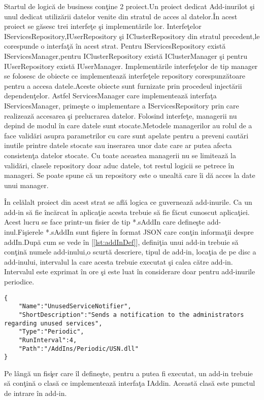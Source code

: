\documentclass[a4paper,12pt]{report}
\let\oldref\ref
\renewcommand{\ref}[1]{[\oldref{#1}]}
\begin{document}
Startul  de logic\u a de business con\c tine 2 proiect.Un proiect dedicat Add-inurilot \c si unul dedicat utiliz\u arii 
datelor venite din stratul de acces al datelor.\^In acest proiect se g\u asesc trei interfe\c te \c si implement\u arile lor.
Interfe\c telor IServicesRepository,IUserRepository \c si IClusterRepository  din stratul precedent,le corespunde o 
interfa\c t\u a \^in acest strat. Pentru IServicesRepository exist\u a IServicesManager,pentru IClusterRepository exist\u a 
IClusterManager \c si pentru IUserRepository exist\u a IUserManager. Implement\u arile interfe\c telor de tip manager se folosesc
de obiecte ce implementeaz\u a interfe\c tele repository corespunz\u atoare pentru a accesa datele.Aceste obiecte sunt 
furnizate prin procedeul inject\u arii dependen\c telor. Astfel ServicesManager care  implementeaz\u a interfa\c ta 
IServicesManager, prime\c ste o implementare a IServicesRepository prin care realizeaz\u a accesarea \c si prelucrarea datelor.
Folosind interfe\c te, managerii nu depind de modul \^in care datele sunt stocate.Metodele managerilor au rolul de a face 
valid\u ari asupra parametrilor cu care sunt apelate pentru a preveni caut\u ari inutile printre datele stocate sau
inserarea unor date care ar putea afecta consisten\c ta datelor stocate. Cu toate aceastea managerii nu se limiteaz\u a 
la valid\u ari, clasele repository doar aduc datele, tot restul logicii se petrece \^in manageri. Se poate spune c\u a un repository
este o unealt\u a care \^ii d\u a acces la date unui manager.

\^In cel\u alalt proiect din acest strat se afl\u a logica ce guverneaz\u a add-inurile. Ca un add-in 
s\u a fie \^inc\u arcat \^in aplica\c tie acesta trebuie s\u a fie f\u acut cunoscut aplica\c tiei.
Acest lucru se face printr-un fisier de tip *.sAddIn care define\c ste add-inul.Fi\c sierele *.sAddIn sunt fi\c siere
\^in format JSON care con\c tin informa\c tii despre addIn.Dup\u a  cum se vede \^in \ref{lst:addInDef}, defini\c tia 
unui add-in trebuie s\u a con\c tin\u a numele add-inului,o scurt\u a descriere, tipul de add-in, loca\c tia de pe disc a add-inului, intervalul la care 
acesta trebuie executat \c si calea c\u atre add-in. Intervalul este exprimat \^in ore \c si este luat \^in considerare 
doar pentru add-inurile periodice.

\begin{lstlisting}[caption={Defini\c tie a unui AddIn},label={lst:addInDef},breaklines]
{
	"Name":"UnusedServiceNotifier",
	"ShortDescription":"Sends a notification to the administrators regarding unused services",
	"Type":"Periodic",
	"RunInterval":4,
	"Path":"/AddIns/Periodic/USN.dll"
}
\end{lstlisting}
Pe l\^ang\u a un fis\c ier care \^il define\c ste, pentru a putea fi executat, un add-in trebuie s\u a con\c tin\u a o clas\u a 
ce implementeaz\u a interfa\c ta IAddin. Aceast\u a clas\u a este punctul de intrare \^in add-in.
\end{document}
